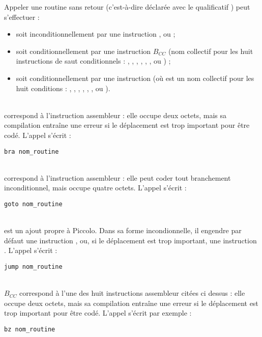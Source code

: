 
Appeler une routine sans retour (c'est-à-dire déclarée avec le qualificatif ) peut s'effectuer :
\begin{itemize}
  \item soit inconditionnellement par une instruction  ,  ou  ;
  \item soit conditionnellement par une instruction $B_{CC}$ (nom collectif pour les huit instructions de saut conditionnels : , , , , , ,  ou ) ;
  \item soit conditionnellement par une instruction  (où  est un nom collectif pour les huit conditions : , , , , , ,  ou ).
\end{itemize}



~\\
 correspond à l’instruction assembleur  : elle occupe deux octets, mais sa compilation entraîne une erreur si le déplacement est trop important pour être codé. L'appel s'écrit :
\begin{lstlisting}[language=piccolo]
bra nom_routine
\end{lstlisting}



~\\
 correspond à l’instruction assembleur  : elle peut coder tout branchement inconditionnel, mais occupe quatre octets. L'appel s'écrit :
\begin{lstlisting}[language=piccolo]
goto nom_routine
\end{lstlisting}


~\\
 est un ajout propre à Piccolo. Dans sa forme incondionnelle, il engendre par défaut une instruction , ou, si le déplacement est trop important, une instruction . L'appel s'écrit :
\begin{lstlisting}[language=piccolo]
jump nom_routine
\end{lstlisting}

~\\
$B_{CC}$ correspond à l’une des huit instructions assembleur citées ci dessus : elle occupe deux octets, mais sa compilation entraîne une erreur si le déplacement est trop important pour être codé. L'appel s'écrit par exemple :
\begin{lstlisting}[language=piccolo]
bz nom_routine
\end{lstlisting}



